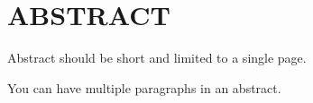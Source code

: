 
\chapter*{\rm \large \bf ABSTRACT}
\vspace{4.0mm}
\par Abstract should be short and limited to a single page.

\par You can have multiple paragraphs in an abstract.
\newpage
